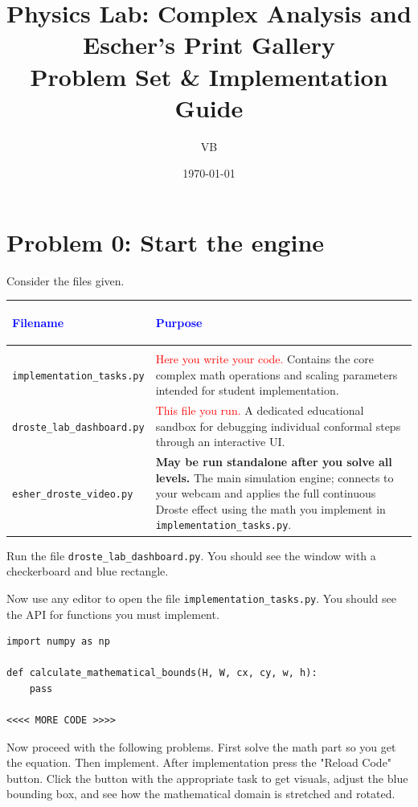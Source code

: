 \documentclass[11pt]{article}
\title{Physics Lab: Complex Analysis and Escher's Print Gallery \\ \large Problem Set \& Implementation Guide}
\author{VB}
\date{\today}
\begin{document}
\maketitle

\section*{Problem 0: Start the engine}

Consider the files given.
\begin{center}
\renewcommand{\arraystretch}{1.5}
\begin{tabularx}{\textwidth}{@{} >{\bfseries\raggedright\arraybackslash}p{5.5cm} X @{}}
\toprule
\textcolor{blue}{Filename} & \textcolor{blue}{Purpose} \\ \midrule
\multicolumn{2}{@{}l}{\textbf{Direct Interaction}} \\ \midrule
\lstinline|implementation_tasks.py| & \textcolor{red}{Here you write your code.} Contains the core complex math operations and scaling parameters intended for student implementation. \\
\lstinline|droste_lab_dashboard.py| & \textcolor{red}{This file you run.} A dedicated educational sandbox for debugging individual conformal steps through an interactive UI. \\
\lstinline|esher_droste_video.py| & \textbf{May be run standalone after you solve all levels.} The main simulation engine; connects to your webcam and applies the full continuous Droste effect using the math you implement in \lstinline|implementation_tasks.py|. \\ \midrule
\bottomrule
\end{tabularx}
\end{center}


Run the file \lstinline|droste_lab_dashboard.py|. You should see the window with a checkerboard and blue rectangle.

Now use any editor to open the file \lstinline|implementation_tasks.py|. You should see the API for functions you must implement.

\begin{lstlisting}
import numpy as np

def calculate_mathematical_bounds(H, W, cx, cy, w, h):
    pass

<<<< MORE CODE >>>>
\end{lstlisting}

Now proceed with the following problems. First solve the math part so you get the equation. Then implement. After implementation press the "Reload Code" button. Click the button with the appropriate task to get visuals, adjust the blue bounding box, and see how the mathematical domain is stretched and rotated.
\end{document}
